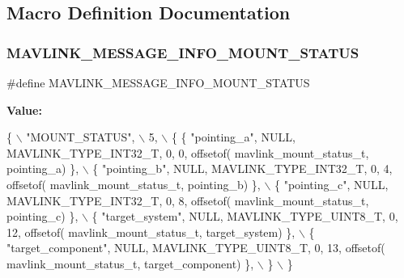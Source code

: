 \subsection{Macro Definition Documentation}
\mbox{\label{mavlink__msg__mount__status_8h_aeb96dee0242b8bac0739fe05a4401a10}} 
\subsubsection{M\+A\+V\+L\+I\+N\+K\+\_\+\+M\+E\+S\+S\+A\+G\+E\+\_\+\+I\+N\+F\+O\+\_\+\+M\+O\+U\+N\+T\+\_\+\+S\+T\+A\+T\+US}
{\footnotesize\ttfamily \#define M\+A\+V\+L\+I\+N\+K\+\_\+\+M\+E\+S\+S\+A\+G\+E\+\_\+\+I\+N\+F\+O\+\_\+\+M\+O\+U\+N\+T\+\_\+\+S\+T\+A\+T\+US}

{\bfseries Value\+:}
\begin{DoxyCode}
\{ \(\backslash\)
    \textcolor{stringliteral}{"MOUNT\_STATUS"}, \(\backslash\)
    5, \(\backslash\)
    \{  \{ \textcolor{stringliteral}{"pointing\_a"}, NULL, MAVLINK_TYPE_INT32_T, 0, 0, offsetof(
      mavlink_mount_status_t, pointing\_a) \}, \(\backslash\)
         \{ \textcolor{stringliteral}{"pointing\_b"}, NULL, MAVLINK_TYPE_INT32_T, 0, 4, offsetof(
      mavlink_mount_status_t, pointing\_b) \}, \(\backslash\)
         \{ \textcolor{stringliteral}{"pointing\_c"}, NULL, MAVLINK_TYPE_INT32_T, 0, 8, offsetof(
      mavlink_mount_status_t, pointing\_c) \}, \(\backslash\)
         \{ \textcolor{stringliteral}{"target\_system"}, NULL, MAVLINK_TYPE_UINT8_T, 0, 12, offsetof(
      mavlink_mount_status_t, target\_system) \}, \(\backslash\)
         \{ \textcolor{stringliteral}{"target\_component"}, NULL, MAVLINK_TYPE_UINT8_T, 0, 13, offsetof(
      mavlink_mount_status_t, target\_component) \}, \(\backslash\)
         \} \(\backslash\)
\}
\end{DoxyCode}
\mbox{\label{mavlink__msg__mount__status_8h_a89e4fcb50d22709801b8700f6a6285df}} 
